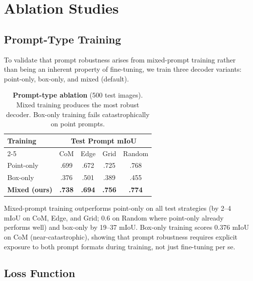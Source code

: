 \section{Ablation Studies}

\subsection{Prompt-Type Training}
\label{sec:ablation_prompt}

To validate that prompt robustness arises from mixed-prompt training rather than being an inherent property of fine-tuning, we train three decoder variants: point-only, box-only, and mixed (default).

\begin{table}[t]
\centering
\caption{\textbf{Prompt-type ablation} (500 test images). Mixed training produces the most robust decoder. Box-only training fails catastrophically on point prompts.}
\label{tab:ablation_prompt}
\small
\begin{tabular}{lcccc}
\toprule
\multirow{2}{*}{Training} & \multicolumn{4}{c}{Test Prompt mIoU} \\
\cmidrule(lr){2-5}
 & CoM & Edge & Grid & Random \\
\midrule
Point-only & .699 & .672 & .725 & .768 \\
Box-only & .376 & .501 & .389 & .455 \\
\textbf{Mixed (ours)} & \textbf{.738} & \textbf{.694} & \textbf{.756} & \textbf{.774} \\
\bottomrule
\end{tabular}
\end{table}

Mixed-prompt training outperforms point-only on all test strategies (by 2--4 mIoU on CoM, Edge, and Grid; 0.6 on Random where point-only already performs well) and box-only by 19--37 mIoU. Box-only training scores 0.376 mIoU on CoM (near-catastrophic), showing that prompt robustness requires explicit exposure to both prompt formats during training, not just fine-tuning per se.

\subsection{Loss Function}

